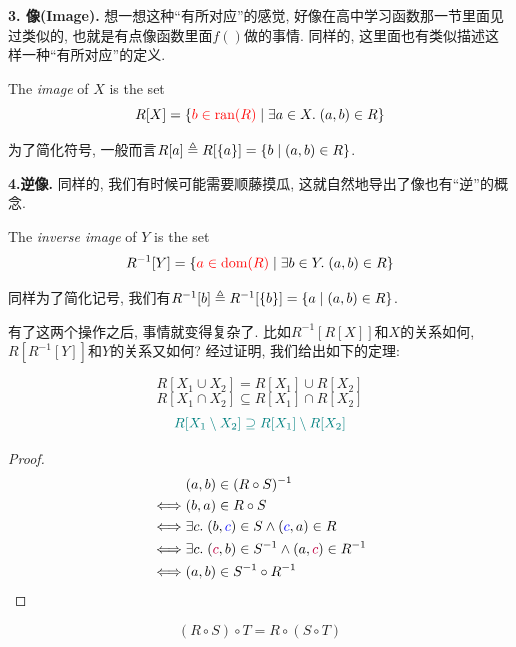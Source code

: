 \vspace*{1pt}
\textbf{3. 像(Image). } 想一想这种``有所对应''的感觉, 好像在高中学习函数那一节里面见过类似的, 也就是有点像函数里面$f()$做的事情.  同样的, 这里面也有类似描述这样一种``有所对应''的定义. 

\begin{definition}[像 (Image)]
  The {\it image} of $X$  is the set
  \[
    R[X] = \{\textcolor{red}{b \in \text{ran}(R)} \mid \exists a \in X.\; (a, b) \in R\}
  \]
\end{definition}
为了简化符号, 一般而言$R[a] \triangleq R[\{a\}] = \{b \mid (a, b) \in R\}$. 


\textbf{4.逆像. } 同样的, 我们有时候可能需要顺藤摸瓜, 这就自然地导出了像也有``逆''的概念. 

\begin{definition}
  The {\it inverse image} of $Y$  is the set
  \[
    R^{-1}[Y] = \{\textcolor{red}{a \in \text{dom}(R)} \mid \exists b \in Y.\; (a, b) \in R\}
  \]
\end{definition}
同样为了简化记号, 我们有$R^{-1}[b] \triangleq R^{-1}[\{b\}] = \{a \mid (a, b) \in R\}$. 

有了这两个操作之后, 事情就变得复杂了. 比如$R^{-1}[R[X]] $和$ X$的关系如何, $R[R^{-1}[Y]]$和$Y$的关系又如何? 经过证明, 我们给出如下的定理: 
  
\begin{theorem}
  \[
    R[X_1 \cup X_2] = R[X_1] \cup R[X_2]
  \]
  \[
    R[X_1 \cap X_2] \subseteq R[X_1] \cap R[X_2]
  \]
  \[
    \textcolor{teal}{R[X_1 \setminus X_2] \supseteq R[X_1] \setminus R[X_2]}
  \]
\end{theorem}
\begin{proof}
  \setcounter{equation}{0}
  \begin{align*}
    &(a, b) \in (R \circ S)^{-1} \\
    \iff& (b, a) \in R \circ S \\
    \iff& \exists c.\; (b, \textcolor{blue}{c}) \in S \land (\textcolor{blue}{c}, a) \in R \\
    \iff& \exists c.\; (\textcolor{purple}{c}, b) \in S^{-1} \land (a, \textcolor{purple}{c}) \in R^{-1} \\
    \iff& (a, b) \in S^{-1} \circ R^{-1}
  \end{align*}
\end{proof}
\begin{theorem}
  \[
    (R \circ S) \circ T = R \circ (S \circ T)
  \]
\end{theorem}

